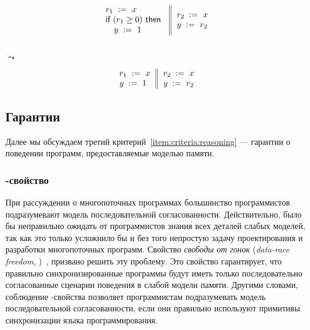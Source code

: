 {\footnotesize
\begin{minipage}{0.45\linewidth}
\begin{equation*}
\inarrII{
   \readInst{}{r_1}{x}             \\
   \kw{if} (r_1 \geq 0) ~\kw{then} \\
   \quad\writeInst{}{y}{1}         \\
}{
  \readInst{}{r_2}{x}               \\
  \writeInst{}{y}{r_2}              \\
}
\end{equation*}
\end{minipage}\hfill%
\begin{minipage}{0.05\linewidth}
\Large~\\ $\leadsto$
\end{minipage}\hfill%
\begin{minipage}{0.4\linewidth}
\begin{equation*}
\inarrII{
   \readInst{}{r_1}{x}             \\
   \writeInst{}{y}{1}              \\
}{
  \readInst{}{r_2}{x}               \\
  \writeInst{}{y}{r_2}              \\
}
\end{equation*}
\end{minipage}
}

\subsection{Гарантии}

Далее мы обсуждаем третий критерий~\ref{item:criteria:reasoning} ---
гарантии о поведении программ, предоставляемые моделью памяти.

\subsubsection{\DRF-свойство}
\label{sec:background:drf}

При рассуждении о многопоточных программах  
большинство программистов подразумевают 
модель последовательной согласованности. 
Действительно, было бы неправильно ожидать
от программистов знания всех деталей слабых моделей, 
так как это только усложнило бы и без того 
непростую задачу проектирования и разработки
многопоточных программ. 
Свойство \emph{свободы от гонок}
(\emph{data-race freedom}, \DRF)~\cite{Manson-al:POPL05}, 
призвано решить эту проблему. 
Это свойство гарантирует, что правильно 
синхронизированные программы будут иметь 
только последовательно согласованные 
сценарии поведения в слабой модели памяти. 
Другими словами, соблюдение \DDF-свойства позволяет программистам 
подразумевать модель последовательной согласованности,
если они правильно используют примитивы синхронизации языка программирования. 

